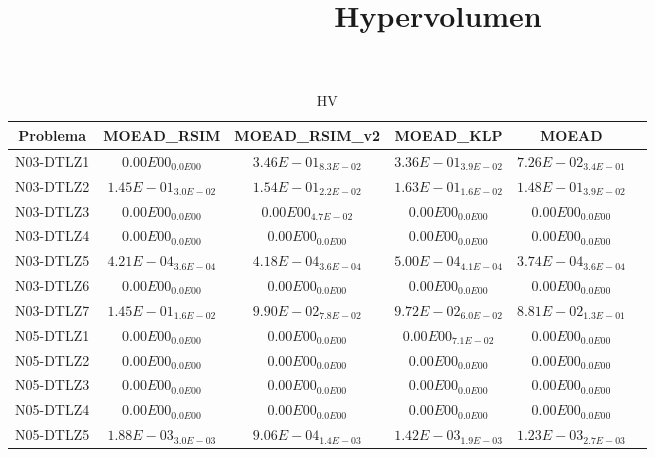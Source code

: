 \documentclass{article}
\title{Hypervolumen}
\author{}
\begin{document}
\maketitle
\begin{table*}[ht!]
\scriptsize
\caption{HV}
\centering\begin{tabular}{|c||c||c||c||c||c|} \hline
Problema &MOEAD_RSIM &MOEAD_RSIM_v2 &MOEAD_KLP &MOEAD\\\hline
N03-DTLZ1 &$0.00E00_{0.0E00}$ &\cellcolor{gray95}$3.46E-01_{8.3E-02}$ &\cellcolor{gray25}$3.36E-01_{3.9E-02}$ &$7.26E-02_{3.4E-01}$\\ 
\hline
N03-DTLZ2 &$1.45E-01_{3.0E-02}$ &\cellcolor{gray25}$1.54E-01_{2.2E-02}$ &\cellcolor{gray95}$1.63E-01_{1.6E-02}$ &$1.48E-01_{3.9E-02}$\\ 
\hline
N03-DTLZ3 &\cellcolor{gray95}$0.00E00_{0.0E00}$ &$0.00E00_{4.7E-02}$ &\cellcolor{gray25}$0.00E00_{0.0E00}$ &$0.00E00_{0.0E00}$\\ 
\hline
N03-DTLZ4 &\cellcolor{gray95}$0.00E00_{0.0E00}$ &\cellcolor{gray25}$0.00E00_{0.0E00}$ &$0.00E00_{0.0E00}$ &$0.00E00_{0.0E00}$\\ 
\hline
N03-DTLZ5 &\cellcolor{gray25}$4.21E-04_{3.6E-04}$ &$4.18E-04_{3.6E-04}$ &\cellcolor{gray95}$5.00E-04_{4.1E-04}$ &$3.74E-04_{3.6E-04}$\\ 
\hline
N03-DTLZ6 &\cellcolor{gray95}$0.00E00_{0.0E00}$ &\cellcolor{gray25}$0.00E00_{0.0E00}$ &$0.00E00_{0.0E00}$ &$0.00E00_{0.0E00}$\\ 
\hline
N03-DTLZ7 &\cellcolor{gray95}$1.45E-01_{1.6E-02}$ &\cellcolor{gray25}$9.90E-02_{7.8E-02}$ &$9.72E-02_{6.0E-02}$ &$8.81E-02_{1.3E-01}$\\ 
\hline
N05-DTLZ1 &\cellcolor{gray95}$0.00E00_{0.0E00}$ &\cellcolor{gray25}$0.00E00_{0.0E00}$ &$0.00E00_{7.1E-02}$ &$0.00E00_{0.0E00}$\\ 
\hline
N05-DTLZ2 &\cellcolor{gray95}$0.00E00_{0.0E00}$ &\cellcolor{gray25}$0.00E00_{0.0E00}$ &$0.00E00_{0.0E00}$ &$0.00E00_{0.0E00}$\\ 
\hline
N05-DTLZ3 &\cellcolor{gray95}$0.00E00_{0.0E00}$ &\cellcolor{gray25}$0.00E00_{0.0E00}$ &$0.00E00_{0.0E00}$ &$0.00E00_{0.0E00}$\\ 
\hline
N05-DTLZ4 &\cellcolor{gray95}$0.00E00_{0.0E00}$ &\cellcolor{gray25}$0.00E00_{0.0E00}$ &$0.00E00_{0.0E00}$ &$0.00E00_{0.0E00}$\\ 
\hline
N05-DTLZ5 &\cellcolor{gray95}$1.88E-03_{3.0E-03}$ &$9.06E-04_{1.4E-03}$ &\cellcolor{gray25}$1.42E-03_{1.9E-03}$ &$1.23E-03_{2.7E-03}$\\ 
\hline

\end{tabular}
\end{table*}
\end{document}
